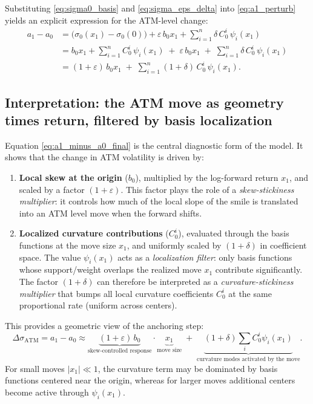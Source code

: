 \documentclass[11pt,a4paper]{report}
\begin{document}
Substituting \eqref{eq:sigma0_basis} and \eqref{eq:sigma_eps_delta} into \eqref{eq:a1_perturb} yields an explicit expression for the ATM-level change:
\begin{align}
a_1-a_0
&=
\big(\sigma_0(x_1)-\sigma_0(0)\big)
+ \varepsilon\, b_0 x_1 + \sum_{i=1}^n \delta\, C_0^{i}\,\psi_i(x_1)
\nonumber\\
&=
b_0 x_1 + \sum_{i=1}^n C_0^{i}\,\psi_i(x_1)
\;+\;
\varepsilon\, b_0 x_1
\;+\;
\sum_{i=1}^n \delta\, C_0^{i}\,\psi_i(x_1)
\nonumber\\
&=
(1+\varepsilon)\, b_0 x_1
\;+\;
\sum_{i=1}^n (1+\delta)\, C_0^{i}\,\psi_i(x_1).
\label{eq:a1_minus_a0_final}
\end{align}

\subsection{Interpretation: the ATM move as geometry times return, filtered by basis localization}
Equation \eqref{eq:a1_minus_a0_final} is the central diagnostic form of the model.
It shows that the change in ATM volatility is driven by:
\begin{enumerate}
\item \textbf{Local skew at the origin} ($b_0$), multiplied by the log-forward return $x_1$, and scaled by a factor $(1+\varepsilon)$.
This factor plays the role of a \emph{skew-stickiness multiplier}: it controls how much of the local slope of the smile is translated into an ATM level move when the forward shifts.
\item \textbf{Localized curvature contributions} ($C_0^i$), evaluated through the basis functions at the move size $x_1$, and uniformly scaled by $(1+\delta)$ in coefficient space.
The value $\psi_i(x_1)$ acts as a \emph{localization filter}: only basis functions whose support/weight overlaps the realized move $x_1$ contribute significantly.
The factor $(1+\delta)$ can therefore be interpreted as a \emph{curvature-stickiness multiplier} that bumps all local curvature coefficients $C_0^i$ at the same proportional rate (uniform across centers).
\end{enumerate}

This provides a geometric view of the anchoring step:
\begin{equation}
\Delta\sigma_{\mathrm{ATM}}
=
a_1-a_0
\approx
\underbrace{(1+\varepsilon)\,b_0}_{\text{skew-controlled response}}
\cdot
\underbrace{x_1}_{\text{move size}}
\;+\;
\underbrace{(1+\delta)\sum_i C_0^i\psi_i(x_1)}_{\text{curvature modes activated by the move}}.
\end{equation}
For small moves $|x_1|\ll 1$, the curvature term may be dominated by basis functions centered near the origin, whereas for larger moves additional centers become active through $\psi_i(x_1)$.
\end{document}
